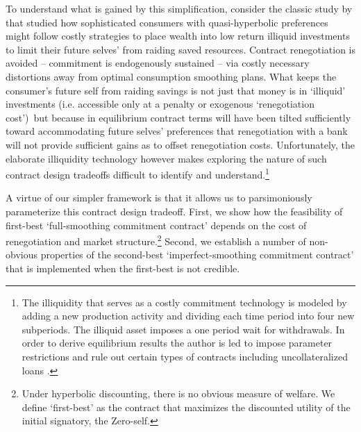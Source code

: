 \documentclass[11pt,english]{article}
\theoremstyle{plain}
\theoremstyle{definition}
\begin{document}
 To understand what is gained by this simplification, consider the classic study by \citet{laibson1997} that studied how sophisticated consumers with quasi-hyperbolic preferences might follow costly strategies to place wealth into low return illiquid investments to limit their future selves' from raiding saved resources. Contract renegotiation is avoided -- commitment is endogenously sustained  -- via costly  necessary distortions away from optimal consumption smoothing plans. What keeps the consumer's future self from raiding savings is not just that money is in `illiquid' investments (i.e. accessible only at a penalty or exogenous `renegotiation cost')\ but because in equilibrium contract terms will have been tilted sufficiently toward accommodating future selves' preferences that  renegotiation with a bank will not provide sufficient gains as to offset renegotiation costs. Unfortunately, the elaborate illiquidity technology however  makes exploring the nature of such contract design tradeoffs difficult to identify and understand.\footnote{The illiquidity that serves as a costly commitment technology is modeled by adding a new production activity and dividing each time period into four new subperiods. The illiquid asset imposes a one period wait for withdrawals. In order to derive equilibrium results the author is led to impose parameter restrictions and rule out certain types of contracts including uncollateralized loans \citep[see also][]{angeletos2001}.}  

A virtue of our simpler framework is that it allows us to parsimoniously parameterize this contract design tradeoff. First, we show how the feasibility
of first-best `full-smoothing commitment contract' depends on the
cost of renegotiation and market structure.\footnote{Under hyperbolic discounting, there is no obvious measure of welfare.
We define `first-best' as the contract that maximizes the discounted
utility of the initial signatory, the Zero-self.} Second, we establish a number of non-obvious properties of the second-best
`imperfect-smoothing commitment contract' that is implemented when
the first-best is not credible.
\end{document}
